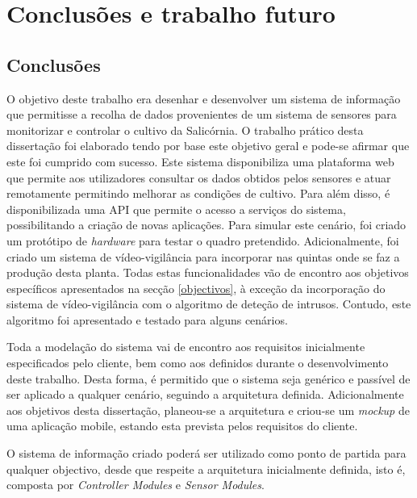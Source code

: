 \chapter{Conclusões e trabalho futuro}


\section{Conclusões}



O objetivo deste trabalho era desenhar e desenvolver um sistema de informação que permitisse a recolha de dados provenientes de um sistema de sensores para monitorizar e controlar o cultivo da Salicórnia. O trabalho prático desta dissertação foi elaborado tendo por base este objetivo geral e pode-se afirmar que este foi cumprido com sucesso. Este sistema disponibiliza uma plataforma web que permite aos utilizadores consultar os dados obtidos pelos sensores e atuar remotamente permitindo melhorar as condições de cultivo. Para além disso, é disponibilizada uma \ac{API} que permite o acesso a serviços do sistema, possibilitando a criação de novas aplicações. Para simular este cenário, foi criado um protótipo de \textit{hardware} para testar o quadro pretendido. Adicionalmente, foi criado um sistema de vídeo-vigilância para incorporar nas quintas onde se faz a produção desta planta. Todas estas funcionalidades vão de encontro aos objetivos específicos apresentados na secção \ref{objectivos}, à exceção da incorporação do sistema de vídeo-vigilância com o algoritmo de deteção de intrusos. Contudo, este algoritmo foi apresentado e testado para alguns cenários. 

Toda a modelação do sistema vai de encontro aos requisitos inicialmente especificados pelo cliente, bem como aos definidos durante o desenvolvimento deste trabalho. Desta forma, é permitido que o sistema seja genérico e passível de ser aplicado a qualquer cenário, seguindo a arquitetura definida. Adicionalmente aos objetivos desta dissertação, planeou-se a arquitetura e criou-se um \textit{mockup} de uma aplicação mobile, estando esta prevista pelos requisitos do cliente. 


O sistema de informação criado poderá ser utilizado como ponto de partida para qualquer objectivo, desde que respeite a arquitetura inicialmente definida, isto é, composta por \textit{Controller Modules} e \textit{Sensor Modules}. 



